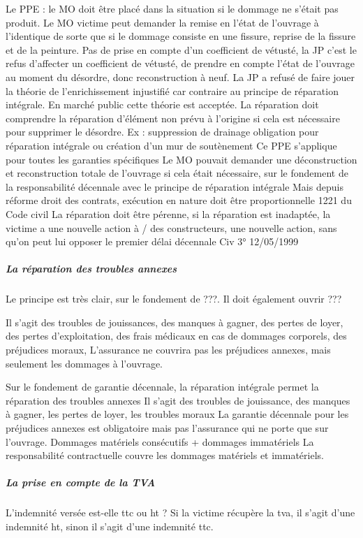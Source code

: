 				Le PPE : le MO doit être placé dans la situation si le dommage ne s’était pas produit. Le MO victime peut demander la remise en l’état de l’ouvrage à l’identique de sorte que si le dommage consiste en une fissure, reprise de la fissure et de la peinture.
				Pas de prise en compte d’un coefficient de vétusté, la JP c’est le refus d’affecter un coefficient de vétusté, de prendre en compte l’état de l’ouvrage au moment du désordre, donc reconstruction à neuf.
				La JP a refusé de faire jouer la théorie de l’enrichissement injustifié car contraire au principe de réparation intégrale. En marché public cette théorie est acceptée.
				La réparation doit comprendre la réparation d’élément non prévu à l’origine si cela est nécessaire pour supprimer le désordre.
				Ex : suppression de drainage obligation pour réparation intégrale ou création d’un mur de soutènement
				Ce PPE s’applique pour toutes les garanties spécifiques
				Le MO pouvait demander une déconstruction et reconstruction totale de l’ouvrage si cela était nécessaire, sur le fondement de la responsabilité décennale avec le principe de réparation intégrale
				Mais depuis réforme droit des contrats, exécution en nature doit être proportionnelle 1221 du Code civil
				La réparation doit être pérenne, si la réparation est inadaptée, la victime a une nouvelle action à / des constructeurs, une nouvelle action, sans qu’on peut lui opposer le premier délai décennale Civ 3° 12/05/1999


				\subparagraph{La réparation des troubles annexes} Le principe est très clair, sur le fondement de ???. Il doit également ouvrir ???

				Il s'agit des troubles de jouissances, des manques à gagner, des pertes de loyer, des pertes d'exploitation, des frais médicaux en cas de dommages corporels, des préjudices moraux, \etc L'assurance ne couvrira pas les préjudices annexes, mais seulement les dommages à l'ouvrage.

				Sur le fondement de garantie décennale, la réparation intégrale permet la réparation des troubles annexes
				Il s’agit des troubles de jouissance, des manques à gagner, les pertes de loyer, les troubles moraux
				La garantie décennale pour les préjudices annexes est obligatoire mais pas l’assurance qui ne porte que sur l’ouvrage.
				Dommages matériels consécutifs + dommages immatériels
				La responsabilité contractuelle couvre les dommages matériels et immatériels.


				\subparagraph{La prise en compte de la TVA} \label{tvaIndemnite} L'indemnité versée est-elle ttc ou ht ? Si la victime récupère la tva, il s'agit d'une indemnité ht, sinon il s'agit d'une indemnité ttc.

